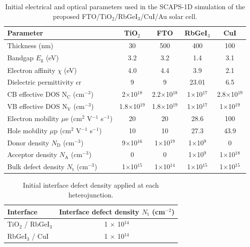 \documentclass[11pt]{article}
\begin{document}
\begin{table}[htbp]
\centering
{\footnotesize\setlength{\tabcolsep}{3pt}
\begin{tabularx}{\textwidth}{Xcccc}
\hline
Parameter & TiO$_{2}$ & FTO & RbGeI$_{3}$ & CuI
\\\hline
Thickness (nm) & 30 & 500 & 400 & 100\\
Bandgap $E_{\mathrm{g}}$ (eV) & 3.2 & 3.2 & 1.4 & 3.1\\
Electron affinity $\chi$ (eV) & 4.0 & 4.4 & 3.9 & 2.1\\
Dielectric permittivity $\epsilon$r & 9 & 9 & 23.01 & 6.5\\
CB effective DOS N$_{\mathrm{C}}$ (cm$^{-3}$) & 2$\times$10$^{18}$ & 2.2$\times$10$^{18}$ & 1$\times$10$^{17}$ & 2.8$\times$10$^{19}$\\
VB effective DOS N$_{\mathrm{V}}$ (cm$^{-3}$) & 1.8$\times$10$^{19}$ & 1.8$\times$10$^{19}$ & 1$\times$10$^{17}$ & 1$\times$10$^{19}$\\
Electron mobility $\mu$e (cm$^{2}$ V$^{-1}$ s$^{-1}$) & 20 & 20 & 28.6 & 100\\
Hole mobility $\mu$p (cm$^{2}$ V$^{-1}$ s$^{-1}$) & 10 & 10 & 27.3 & 43.9\\
Donor density $N_{\mathrm{D}}$ (cm$^{-3}$) & 9$\times$10$^{16}$ & 1$\times$10$^{19}$ & 1$\times$10$^{9}$ & 0\\
Acceptor density $N_{\mathrm{A}}$ (cm$^{-3}$) & 0 & 0 & 1$\times$10$^{9}$ & 1$\times$10$^{18}$\\
Bulk defect density $N_{\mathrm{t}}$ (cm$^{-3}$) & 1$\times$10$^{15}$ & 1$\times$10$^{14}$ & 1$\times$10$^{15}$ & 1$\times$10$^{15}$\\
\hline
\end{tabularx}
}
\caption{Initial electrical and optical parameters used in the SCAPS-1D simulation of the proposed FTO/\allowbreak{}TiO$_{2}$/RbGeI$_{3}$/CuI/\allowbreak{}Au solar cell.}
\par{}\par
\end{table}
\begin{table}[htbp]
\centering
{\small\setlength{\tabcolsep}{3pt}
\begin{tabularx}{\textwidth}{Xc}
\hline
Interface & Interface defect density $N_{\mathrm{t}}$ (cm$^{-2}$)
\\\hline
TiO$_{2}$ / RbGeI$_{3}$ & 1 $\times$ 10$^{14}$\\
RbGeI$_{3}$ / CuI & 1 $\times$ 10$^{14}$\\
\hline
\end{tabularx}
}
\caption{Initial interface defect density applied at each heterojunction.}
\par{}\par
\end{table}
\end{document}
